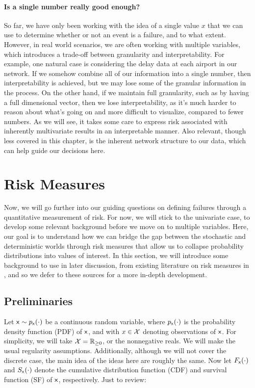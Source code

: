 \paragraph{Is a single number really good enough?} So far, we have only been working with the idea of a single value $x$ that we can use to determine whether or not an event is a failure, and to what extent. However, in real world scenarios, we are often working with multiple variables, which introduces a trade-off between granularity and interpretability. For example, one natural case is considering the delay data at each airport in our network. If we somehow combine all of our information into a single number, then interpretability is achieved, but we may lose some of the granular information in the process. On the other hand, if we maintain full granularity, such as by having a full dimensional vector, then we lose interpretability, as it's much harder to reason about what's going on and more difficult to visualize, compared to fewer numbers. As we will see, it takes some care to express risk associated with inherently multivariate results in an interpretable manner. Also relevant, though less covered in this chapter, is the inherent network structure to our data, which can help guide our decisions here.


\section{Risk Measures}
\label{sec:risk-intro}

Now, we will go further into our guiding questions on defining failures through a quantitative measurement of risk. For now, we will stick to the univariate case, to develop some relevant background before we move on to multiple variables. Here, our goal is to understand how we can bridge the gap between the stochastic and deterministic worlds through risk measures that allow us to collapse probability distributions into values of interest. In this section, we will introduce some background to use in later discussion, from existing literature on risk measures in \cite{Mildenhall_Major_2022, Artzner_Delbaen_Eber_Heath_1999, risks11110194, wirch_hardy_2003}, and so we defer to these sources for a more in-depth development.

\subsection{Preliminaries}

Let $\rx\sim \pxdd$ be a continuous random variable, where $\pxdd$ is the probability density function (PDF) of $\mathsf x$, and with $x\in \mathcal{X}$ denoting observations of $\mathsf x$. For simplicity, we will take $\mathcal{X} = \mathbb R_{\ge0}$, or the nonnegative reals. We will make the usual regularity assumptions. Additionally, although we will not cover the discrete case, the main idea of the ideas here are roughly the same. Now let $\Fxdd$ and $\Sxdd$ denote the cumulative distribution function (CDF) and survival function (SF) of $\mathsf x$, respectively. Just to review:

